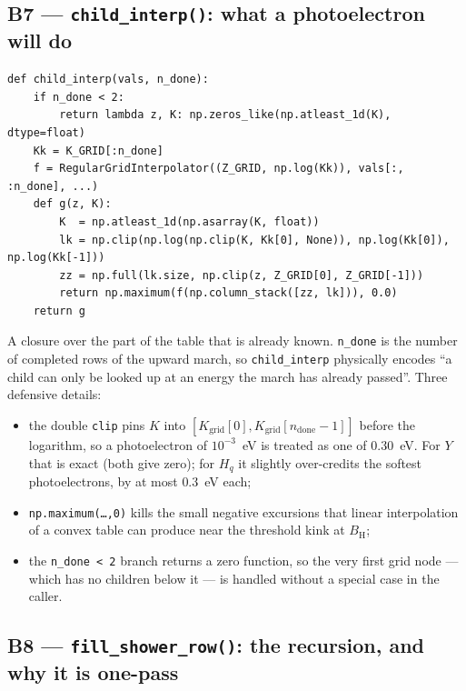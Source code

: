 \documentclass[11pt,a4paper]{article}
\newcommand{\code}[1]{\texttt{\small #1}}
\newcommand{\BH}{B_{\mathrm{H}}}
\begin{document}
\subsection*{B7 --- \code{child\_interp()}: what a photoelectron will do}

\begin{lstlisting}
def child_interp(vals, n_done):
    if n_done < 2:
        return lambda z, K: np.zeros_like(np.atleast_1d(K), dtype=float)
    Kk = K_GRID[:n_done]
    f = RegularGridInterpolator((Z_GRID, np.log(Kk)), vals[:, :n_done], ...)
    def g(z, K):
        K  = np.atleast_1d(np.asarray(K, float))
        lk = np.clip(np.log(np.clip(K, Kk[0], None)), np.log(Kk[0]), np.log(Kk[-1]))
        zz = np.full(lk.size, np.clip(z, Z_GRID[0], Z_GRID[-1]))
        return np.maximum(f(np.column_stack([zz, lk])), 0.0)
    return g
\end{lstlisting}

A closure over the part of the table that is already known.  \code{n\_done} is
the number of completed rows of the upward march, so \code{child\_interp}
physically encodes ``a child can only be looked up at an energy the march has
already passed''.  Three defensive details:

\begin{itemize}[leftmargin=1.3em]
\item the double \code{clip} pins $K$ into $[K_{\mathrm{grid}}[0],
      K_{\mathrm{grid}}[n_{\mathrm{done}}-1]]$ before the logarithm, so a
      photoelectron of $10^{-3}$~eV is treated as one of $0.30$~eV.  For $Y$
      that is exact (both give zero); for $H_q$ it slightly over-credits the
      softest photoelectrons, by at most $0.3$~eV each;
\item \code{np.maximum(\ldots,0)} kills the small negative excursions that
      linear interpolation of a convex table can produce near the threshold
      kink at $\BH$;
\item the \code{n\_done < 2} branch returns a zero function, so the very first
      grid node --- which has no children below it --- is handled without a
      special case in the caller.
\end{itemize}

\subsection*{B8 --- \code{fill\_shower\_row()}: the recursion, and why it is one-pass}
\end{document}
